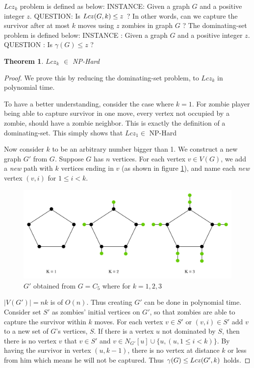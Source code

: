 \documentclass[1p]{elsarticle}
\newtheorem{theorem}{Theorem}
\newcommand{\zn}{\ooalign{$z$\cr\hfil\rule[.5ex]{.2em}{.08ex}\hfil\cr}}
\begin{document}
	$Lcz_k$ problem is defined as below:
	{\newline}
	INSTANCE: Given a graph $G$ and a positive integer $z$.
	{\newline}
	QUESTION: Is $Lc\zn(G,k) \leq z$ ? In other words, can we capture the survivor after at most $k$ moves using $z$ zombies in graph $G$ ?
	{\newline}
	{\newline}
	The dominating-set problem is defined below:
	{\newline}
	INSTANCE : Given a graph $G$ and a positive integer $z$.
	{\newline}
	QUESTION : Is $\gamma(G) \leq z$ ?

	\begin{theorem}
		$Lcz_k$ $\in$ NP-Hard
	\end{theorem}
	\begin{proof}
		We prove this by reducing the dominating-set problem, to $Lcz_k$ in polynomial time.

		To have a better understanding, consider the case where $k=1$. For zombie player being able to capture survivor in
		one move, every vertex not occupied by a zombie, should have a zombie neighbor. This is exactly the definition
		of a dominating-set. This simply shows that $Lcz_1 \in$ NP-Hard 

		Now consider $k$ to be an arbitrary number bigger than 1. We construct a new graph $G'$ from $G$. Suppose $G$
		has $n$ vertices. For each vertex $v \in V(G)$, we add a {\it new} path with $k$ vertices ending in $v$ (as
		shown in figure \ref{fig:p7}), and name each {\it new} vertex $(v,i)$ for $1 \leq i < k$. 

		\begin{figure}[h!]
			\centering
			\includegraphics[width=0.9\linewidth]{fig/LCZ.png}
			\caption{$G'$ obtained from $G = C_5$ where for $k = 1,2,3$}
			\label{fig:p7}
		\end{figure}		


		$|V(G')| = nk$ is of $O(n)$. Thus creating $G'$ can be done in polynomial time. Consider set $S'$ as zombies'
		initial vertices on $G'$, so that zombies are able to capture the survivor within $k$ moves. For each vertex $v \in
		S'$ or $(v,i) \in S'$ add $v$ to a new set of $G$'s vertices, $S$. If there is a vertex $u$ not dominated by
		$S$, then there is no vertex $v$ that $v \in S'$ and $v \in N_{G'}[u] \cup \{u, (u,1 \leq i < k)\}$. By having
		the survivor in vertex $(u, k-1)$, there is no vertex at distance $k$ or less from him which means he will not
		be captured. Thus $\gamma(G) \leq Lc\zn(G',k)$ holds.
		

\end{proof}
\end{document}
